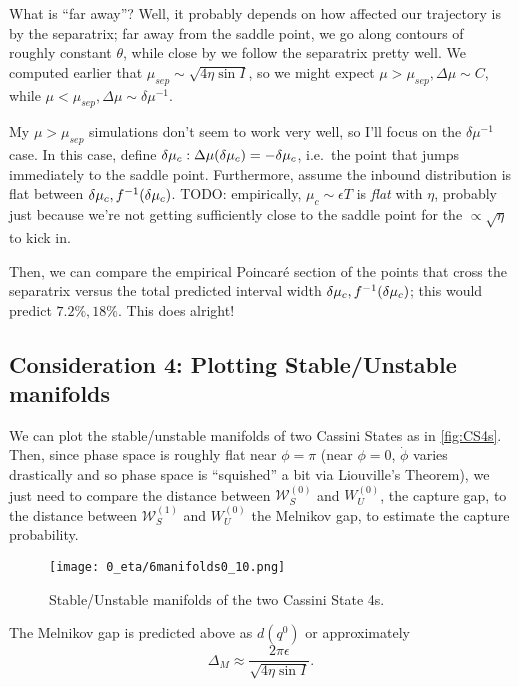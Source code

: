 \documentclass[11pt,
        usenames, %
        dvipsnames %
    ]{article}
\DeclarePairedDelimiter\p{\lparen}{\rparen}
\begin{document}
What is ``far away''? Well, it probably depends on how affected our trajectory
is by the separatrix; far away from the saddle point, we go along contours of
roughly constant $\theta$, while close by we follow the separatrix pretty well.
We computed earlier that $\mu_{sep} \sim \sqrt{4\eta \sin I}$, so we might
expect $\mu > \mu_{sep}, \Delta \mu \sim C$, while $\mu < \mu_{sep}, \Delta
\mu \sim \delta \mu^{-1}$.

My $\mu > \mu_{sep}$ simulations don't seem to work very well, so I'll focus on
the $\delta \mu^{-1}$ case. In this case, define $\delta \mu_c: \Delta
\mu\p*{\delta \mu_c} = -\delta \mu_c$, i.e.\ the point that jumps immediately to
the saddle point. Furthermore, assume the inbound distribution is flat between
$\delta \mu_c, f^{-1}\p*{\delta \mu_c}$. TODO\@: empirically, $\mu_c \sim
\epsilon T$ is \emph{flat} with $\eta$, probably just because we're not getting
sufficiently close to the saddle point for the $\propto \sqrt{\eta}$ to kick in.

Then, we can compare the empirical Poincar\'e section of the points that cross
the separatrix versus the total predicted interval width $\delta \mu_c,
f^{-1}\p*{\delta \mu_c}$; this would predict $7.2\%, 18\%$. This does alright!

\subsection{Consideration 4: Plotting Stable/Unstable
manifolds}\label{ss:melnikov_success}

We can plot the stable/unstable manifolds of two Cassini States as in
\autoref{fig:CS4s}. Then, since phase space is roughly flat near $\phi = \pi$
(near $\phi = 0$, $\dot{\phi}$ varies drastically and so phase space is
``squished'' a bit via Liouville's Theorem), we just need to compare the
distance between $\mathcal{W}^{(0)}_S$ and $W_U^{(0)}$, the capture gap, to the
distance between $\mathcal{W}^{(1)}_S$ and $W_U^{(0)}$ the Melnikov gap, to
estimate the capture probability.
\begin{figure}[t]
    \centering
    \texttt{[image: 0\_eta/6manifolds0\_10.png]}
    \caption{Stable/Unstable manifolds of the two Cassini State
    4s.}\label{fig:CS4s}
\end{figure}

The Melnikov gap is predicted above as $d(q^0)$ or approximately
\begin{equation}
    \Delta_{M} \approx \frac{2\pi \epsilon}{\sqrt{4\eta\sin I}}.
\end{equation}
\end{document}
